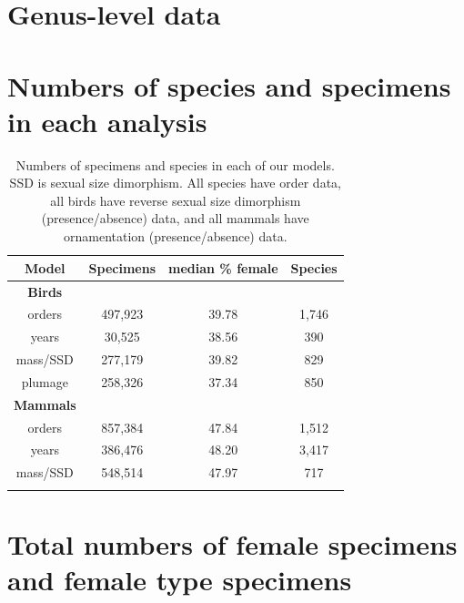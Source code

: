\documentclass[a4paper, 12pt]{article}
\begin{document}
\newpage
\section{Genus-level data}



\newpage
\section{Numbers of species and specimens in each analysis}

\begin{table}[H]
\centering
\begin{tabular}{cccc}

  \hline
  \textbf{Model} & \textbf{Specimens} & \textbf{median \% female} & \textbf{Species}\\ 
  \hline
  \textbf{Birds} & & &\\
  \hline
  orders & 497,923 & 39.78 & 1,746\\
  years & 30,525 & 38.56 & 390\\
  mass/SSD & 277,179 & 39.82 & 829\\
  plumage & 258,326 & 37.34 & 850\\
  \hline
  \textbf{Mammals} &&&\\
  \hline
  orders & 857,384 & 47.84 & 1,512\\
  years & 386,476 & 48.20 & 3,417\\
  mass/SSD & 548,514 & 47.97 & 717\\
  \hline

\label{table_numbers}
\end{tabular}
\caption{Numbers of specimens and species in each of our models. SSD is sexual size dimorphism. All species have order data, all birds have reverse sexual size dimorphism (presence/absence) data, and all mammals have ornamentation (presence/absence) data.} 

\end{table}
\newpage
\section{Total numbers of female specimens and female type specimens}
\end{document}
